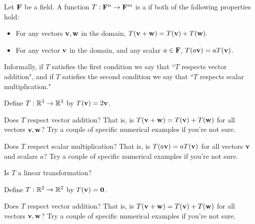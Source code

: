 Let ${\bf {F}}$ be a field.  A function $T: {\bf {F}}^n \rightarrow {\bf {F}}^m$ is a {}
if both of the following properties hold:

\begin{itemize}
\item For any vectors $\mathbf{v}, \mathbf{w}$ in the domain, $T(\mathbf{v} + \mathbf{w}) = T(\mathbf{v}) + T(\mathbf{w}).$ 
\item For any vector $\mathbf{v}$ in the domain, and any scalar $a\in {\bf {F}}$, $T(a\mathbf{v}) = aT(\mathbf{v})$.    
\end{itemize}

Informally, if $T$ satisfies the first condition we say that ``$T$ respects vector addition", and 
if $T$ satisfies the second condition we say that ``$T$ respects scalar multiplication."  

\endedxtext

\endedxvertical






Define $T: \mathbb R^3 \rightarrow \mathbb R^3$ by $T(\mathbf{v}) = 2\mathbf{v}$.  

Does $T$ respect vector addition?  That is, is $T(\mathbf{v} + \mathbf{w}) = T(\mathbf{v}) + T(\mathbf{w})$ for all 
vectors $\mathbf{v},\mathbf{w}$?
Try a couple of specific numerical examples if you're not sure.  


Does $T$ respect scalar multiplication?  
That is, is $T(a\mathbf{v}) = aT(\mathbf{v})$ for all vectors $\mathbf{v}$ and scalars $a$?
Try a couple of specific numerical examples if you're not sure.  



Is $T$ a linear transformation?


\edXsolution{ 
}

\endedxproblem



Define $T: \mathbb R^2 \rightarrow \mathbb R^2$ by $T(\mathbf{v}) = \mathbf{0}$.  

Does $T$ respect vector addition?  That is, is $T(\mathbf{v} + \mathbf{w}) = T(\mathbf{v}) + T(\mathbf{w})$ for all 
vectors $\mathbf{v},\mathbf{w}$?
Try a couple of specific numerical examples if you're not sure.  



